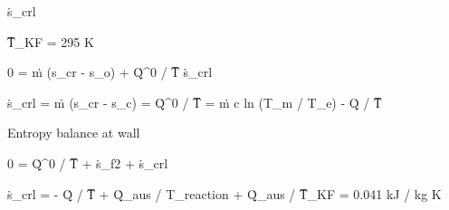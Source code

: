 ṡ_crl

T̅_KF = 295 K

0 = ṁ (s_cr - s_o) + Q̇^0 / T̅ ṡ_crl

ṡ_crl = ṁ (s_cr - s_c) = Q̇^0 / T̅ = ṁ c ln (T_m / T_e) - Q̇ / T̅

Entropy balance at wall

0 = Q̇^0 / T̅ + ṡ_f2 + ṡ_crl

ṡ_crl = - Q̇ / T̅ + Q̇_aus / T_reaction + Q̇_aus / T̅_KF = 0.041 kJ / kg K